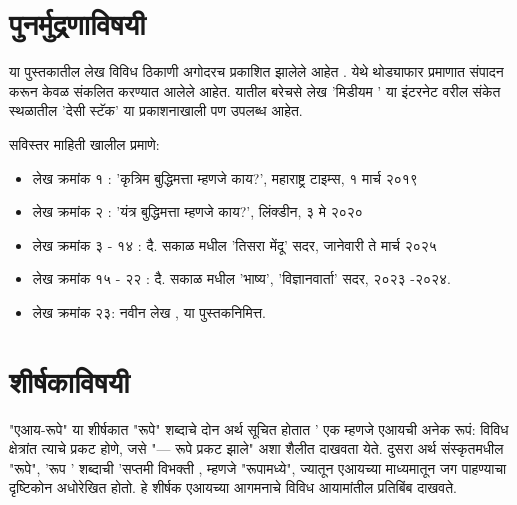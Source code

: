 \chapter*{पुनर्मुद्रणाविषयी}

या पुस्तकातील लेख विविध ठिकाणी अगोदरच प्रकाशित झालेले आहेत .  येथे थोड्याफार प्रमाणात संपादन करून केवळ संकलित करण्यात आलेले आहेत.  यातील बरेचसे लेख 'मिडीयम '  या इंटरनेट वरील संकेत स्थळातील 'देसी स्टॅक' या प्रकाशनाखाली पण उपलब्ध आहेत. 

\vspace{1.5em}
सविस्तर माहिती खालील प्रमाणे:
\begin{itemize}
	\item लेख क्रमांक १ : 'कृत्रिम बुद्धिमत्ता म्हणजे काय?', महाराष्ट्र टाइम्स, १  मार्च २०१९
	\item  लेख क्रमांक २ : 'यंत्र बुद्धिमत्ता म्हणजे काय?', लिंक्डीन, ३ मे २०२०  
	\item  लेख क्रमांक ३ - १४ : दै. सकाळ मधील 'तिसरा मेंदू' सदर, जानेवारी ते मार्च २०२५
	\item  लेख क्रमांक १५ - २२ : दै. सकाळ मधील 'भाष्य', 'विज्ञानवार्ता'  सदर, २०२३ -२०२४. 
	\item  लेख क्रमांक २३:   नवीन लेख ,  या पुस्तकनिमित्त. 
\end{itemize}



\chapter*{शीर्षकाविषयी }

"एआय-रूपे" या शीर्षकात "रूपे" शब्दाचे दोन अर्थ सूचित होतात ' एक म्हणजे एआयची अनेक रूपं: विविध क्षेत्रांत त्याचे प्रकट होणे, जसे "--- रूपे प्रकट झाले" अशा शैलीत दाखवता येते. दुसरा अर्थ संस्कृतमधील "रूपे", 'रूप '  शब्दाची 'सप्तमी विभक्ती , म्हणजे "रूपामध्ये", ज्यातून एआयच्या माध्यमातून जग पाहण्याचा दृष्टिकोन अधोरेखित होतो. हे शीर्षक एआयच्या आगमनाचे विविध आयामांतील प्रतिबिंब दाखवते.